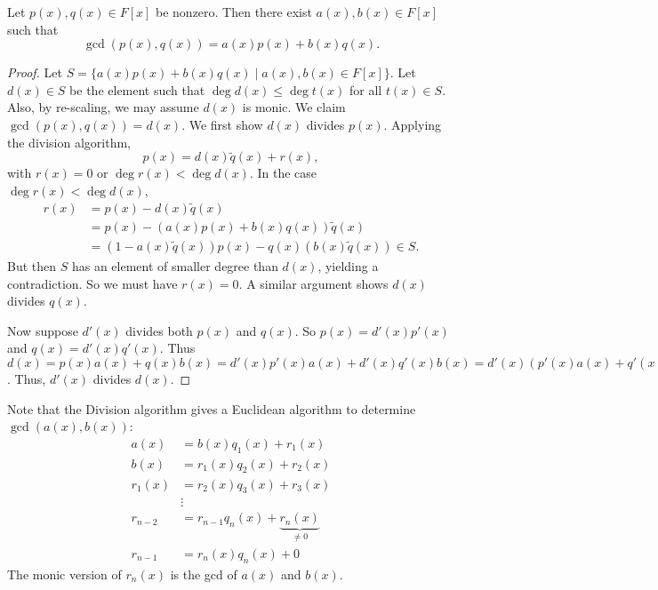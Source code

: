 \begin{theorem}
	Let $p(x),q(x)\in F[x]$ be nonzero. Then there exist $a(x),b(x)\in F[x]$ such that
	$$\gcd(p(x),q(x))=a(x)p(x)+b(x)q(x).$$
\end{theorem}

\begin{proof}
	Let $S=\{a(x)p(x)+b(x)q(x)\mid a(x),b(x)\in F[x]\}$. Let $d(x)\in S$ be the element such that $\deg d(x)\leq\deg t(x)$ for all $t(x)\in S$. Also, by re-scaling, we may assume $d(x)$ is monic. We claim $\gcd(p(x),q(x))=d(x)$. We first show $d(x)$ divides $p(x)$. Applying the division algorithm,
	$$p(x)=d(x)\tilde q(x)+r(x),$$
	with $r(x)=0$ or $\deg r(x)<\deg d(x)$. In the case $\deg r(x)<\deg d(x)$,
	\begin{align*}
		r(x)&=p(x)-d(x)\tilde q(x)\\
		&=p(x)-(a(x)p(x)+b(x)q(x))\tilde q(x)\\
		&=(1-a(x)\tilde q(x))p(x)-q(x)(b(x)\tilde q(x))\in S.
	\end{align*}
	But then $S$ has an element of smaller degree than $d(x)$, yielding a contradiction. So we must have $r(x)=0$. A similar argument shows $d(x)$ divides $q(x)$.

	Now suppose $d'(x)$ divides both $p(x)$ and $q(x)$. So $p(x)=d'(x)p'(x)$ and $q(x)=d'(x)q'(x)$. Thus $d(x)=p(x)a(x)+q(x)b(x)=d'(x)p'(x)a(x)+d'(x)q'(x)b(x)=d'(x)(p'(x)a(x)+q'(x)b(x))$. Thus, $d'(x)$ divides $d(x)$.
\end{proof}

Note that the Division algorithm gives a Euclidean algorithm to determine $\gcd(a(x),b(x))$:
\begin{align*}
	a(x)&=b(x)q_1(x)+r_1(x)\\
	b(x)&=r_1(x)q_2(x)+r_2(x)\\
	r_1(x)&=r_2(x)q_3(x)+r_3(x)\\
	&\vdots\\
	r_{n-2}&=r_{n-1}q_n(x)+\underbrace{r_n(x)}_{\neq 0}\\
	r_{n-1}&=r_n(x)q_n(x)+0
\end{align*}
The monic version of $r_n(x)$ is the gcd of $a(x)$ and $b(x)$.